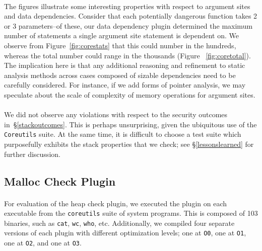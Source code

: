 \documentclass[letterpaper,11pt]{article}
\begin{document}
\paragraph{}
The figures illustrate some interesting properties with respect to argument
sites and data dependencies. Consider that each potentially dangerous function
takes 2 or 3 parameters--of these, our data dependency plugin determined the
maximum number of statements a single argument site statement is dependent on.
We observe from Figure~\ref{fig:corestats} that this could number in the hundreds,
whereas the total number could range in the thousands (Figure ~\ref{fig:coretotal}).
The implication here is that any additional reasoning and refinement to static
analysis methods across cases composed of sizable dependencies need to be
carefully considered. For instance, if we add forms of pointer analysis,
we may speculate about the scale of complexity of memory operations for
argument sites.

\paragraph{}
We did not observe any violations with respect to the security outcomes
in~\S\ref{stackoutcomes}. This is perhaps unsurprising, given the ubiquitous
use of the \texttt{Coreutils} suite. At the same time, it is difficult to
choose a test suite which purposefully exhibits the stack properties that we
check; see \S\ref{lessonslearned} for further discussion.

\subsection{Malloc Check Plugin}
\paragraph{}
For evaluation of the heap check plugin, we executed the plugin on each
executable from the \texttt{coreutils} suite of system programs. This is composed of
103 binaries, such as \texttt{cat}, \texttt{wc}, \texttt{who}, etc. Additionally, we compiled four
separate versions of each plugin with different optimization levels; one at
\texttt{O0}, one at \texttt{O1}, one at \texttt{O2}, and one at \texttt{O3}.
\end{document}
